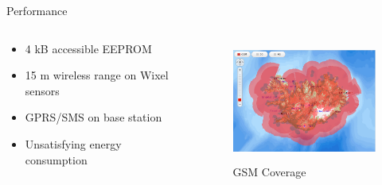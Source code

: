 \documentclass{beamer}
\begin{document}
\begin{frame}{Performance}
\begin{columns}[T] %
     \begin{column}[T]{4cm} %
		\begin{itemize}
		\item 4 kB accessible EEPROM
		\item 15 m wireless range on Wixel sensors
		\item GPRS/SMS on base station	 
		\item Unsatisfying energy consumption 
		\end{itemize}

		\end{column}
		\begin{column}[T]{5cm} %
	     \begin{figure}
	     \includegraphics[height=4cm]{graphics/GSM_Coverage.PNG}
	     \caption{GSM Coverage \cite{vodafone}}	    
	     \end{figure}
	     
		\end{column}
	\end{columns}
\end{frame}
\end{document}

